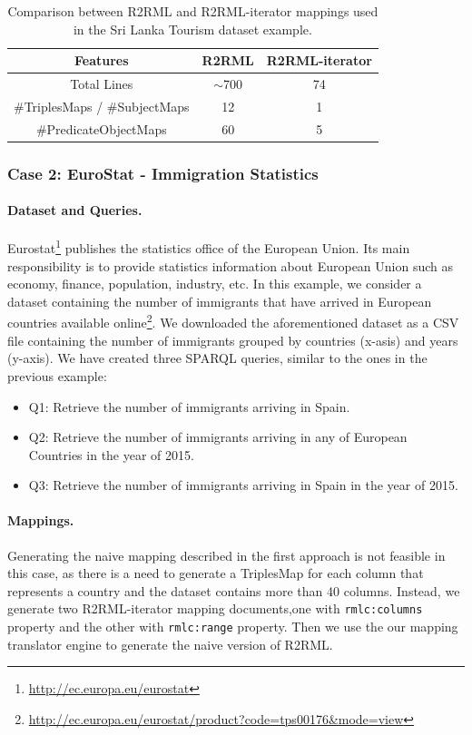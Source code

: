 \begin{table}[tbp]
\caption[R2RML vs R2RML-iterator in Sri Lanka dataset]{Comparison between R2RML and R2RML-iterator mappings used in the Sri Lanka Tourism dataset example.}
\label{table:compare1}
\begin{tabular}{c|c|c}
\hline
\textbf{Features} & \textbf{R2RML}   & \textbf{R2RML-iterator}  \\ \hline
Total Lines   & $\sim$700 & 74 \\ 
\#TriplesMaps / \#SubjectMaps     & 12                & 1           \\
\#PredicateObjectMaps  & 60              & 5            \\ \hline
\end{tabular}
\end{table}

\subsubsection{Case 2: EuroStat - Immigration Statistics}
\noindent\paragraph{Dataset and Queries.} Eurostat\footnote{\url{http://ec.europa.eu/eurostat}} publishes the statistics office of the European Union. Its main responsibility is to provide statistics information about European Union such as economy, finance, population, industry, etc. In this example, we consider a dataset containing the number of immigrants that have arrived in European countries available online\footnote{\url{http://ec.europa.eu/eurostat/product?code=tps00176&mode=view}}. We downloaded the aforementioned dataset as a CSV file containing the number of immigrants grouped by countries (x-asis) and years (y-axis). We have created three SPARQL queries, similar to the ones in the previous example:

\begin{itemize}
\item Q1: Retrieve the number of immigrants arriving in Spain.
\item Q2: Retrieve the number of immigrants arriving in any of European Countries in the year of 2015.
\item Q3: Retrieve the number of immigrants arriving in Spain in the year of 2015.
\end{itemize}

\noindent\paragraph{Mappings.}
Generating the naive mapping described in the first approach is not feasible in this case, as there is a need to generate a TriplesMap for each column that represents a country and the dataset contains more than 40 columns. Instead, we generate two R2RML-iterator mapping documents,one with \texttt{rmlc:columns} property and the other with \texttt{rmlc:range} property. Then we use the our mapping translator engine to generate the naive version of R2RML.

